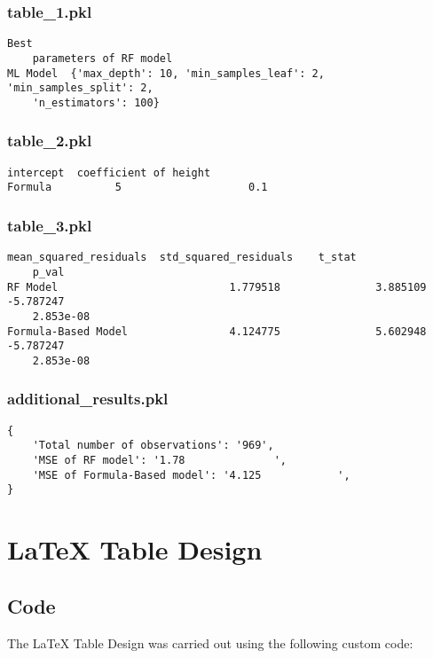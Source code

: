 \documentclass[11pt]{article}
\begin{document}
\subsubsection*{table\_1.pkl}

\begin{Verbatim}[tabsize=4]
                                                                    Best
	parameters of RF model
ML Model  {'max_depth': 10, 'min_samples_leaf': 2, 'min_samples_split': 2,
	'n_estimators': 100}
\end{Verbatim}

\subsubsection*{table\_2.pkl}

\begin{Verbatim}[tabsize=4]
         intercept  coefficient of height
Formula          5                    0.1
\end{Verbatim}

\subsubsection*{table\_3.pkl}

\begin{Verbatim}[tabsize=4]
                     mean_squared_residuals  std_squared_residuals    t_stat
	p_val
RF Model                           1.779518               3.885109 -5.787247
	2.853e-08
Formula-Based Model                4.124775               5.602948 -5.787247
	2.853e-08
\end{Verbatim}

\subsubsection*{additional\_results.pkl}

\begin{Verbatim}[tabsize=4]
{
    'Total number of observations': '969',
    'MSE of RF model': '1.78              ',
    'MSE of Formula-Based model': '4.125            ',
}
\end{Verbatim}

\section{LaTeX Table Design}
\subsection{{Code}}
The LaTeX Table Design was carried out using the following custom code:
\end{document}
